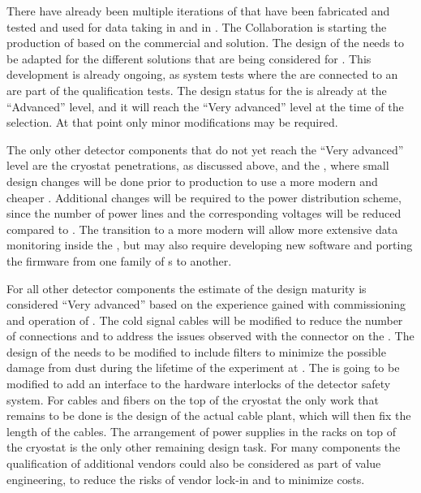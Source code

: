 There have already been multiple iterations of  that
have been fabricated and tested and used for data taking in 
 and in . The  Collaboration
is starting the production of  based on the commercial  and
 solution. The design of the  needs to be adapted
for the different  solutions that are being considered
for . This development is already ongoing, as system tests 
where the  are connected to an  are part
of the qualification tests. The design status for the 
is already at the ``Advanced'' level, and it will reach the 
``Very advanced'' level at the time of the 
selection. At that point only minor modifications may be
required. 

The only other  detector components that do not yet
reach the ``Very advanced'' level are the cryostat penetrations, as
discussed above, and the , where small
design changes will be done prior to production to use a more
modern and cheaper . Additional changes will be required to
the power distribution scheme, since the number of power lines
and the corresponding voltages will be reduced compared to
. The transition to a more modern  will allow 
more extensive data monitoring inside the , but may
also require developing new software and porting the firmware
from one family of s to another. 

For all other detector components the estimate of the design
maturity is considered ``Very advanced'' based on the experience
gained with commissioning and operation of . The 
cold signal cables will be modified to reduce the number of
connections and to address the issues observed with the connector
on the . The design of the  needs to
be modified to include  filters to minimize the possible
damage from dust during the lifetime of the experiment at .
The  is going to be modified to add an interface to
the hardware interlocks of the detector safety system. For
cables and fibers on the top of the cryostat the only work that
remains to be done is the design of the actual cable plant, 
which will then fix the length of the cables. The arrangement
of power supplies in the racks on top of the cryostat is the
only other remaining design task. For many components the
qualification of additional vendors could also be considered
as part of value engineering, to reduce the risks of vendor
lock-in and to minimize costs. 

